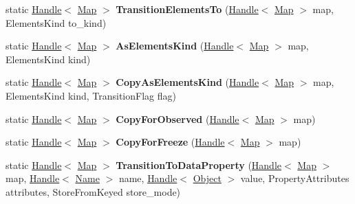 \begin{DoxyCompactItemize}
\item 
\hypertarget{classv8_1_1internal_1_1_map_a401e96aac7c58536324d566b3502a3cf}{}static \hyperlink{classv8_1_1internal_1_1_handle}{Handle}$<$ \hyperlink{classv8_1_1internal_1_1_map}{Map} $>$ {\bfseries Transition\+Elements\+To} (\hyperlink{classv8_1_1internal_1_1_handle}{Handle}$<$ \hyperlink{classv8_1_1internal_1_1_map}{Map} $>$ map, Elements\+Kind to\+\_\+kind)\label{classv8_1_1internal_1_1_map_a401e96aac7c58536324d566b3502a3cf}

\item 
\hypertarget{classv8_1_1internal_1_1_map_a15e6d5907827dda6c7abb49bb075ef5c}{}static \hyperlink{classv8_1_1internal_1_1_handle}{Handle}$<$ \hyperlink{classv8_1_1internal_1_1_map}{Map} $>$ {\bfseries As\+Elements\+Kind} (\hyperlink{classv8_1_1internal_1_1_handle}{Handle}$<$ \hyperlink{classv8_1_1internal_1_1_map}{Map} $>$ map, Elements\+Kind kind)\label{classv8_1_1internal_1_1_map_a15e6d5907827dda6c7abb49bb075ef5c}

\item 
\hypertarget{classv8_1_1internal_1_1_map_a1eeb7d87a60e6cf46bd069bf05b9f563}{}static \hyperlink{classv8_1_1internal_1_1_handle}{Handle}$<$ \hyperlink{classv8_1_1internal_1_1_map}{Map} $>$ {\bfseries Copy\+As\+Elements\+Kind} (\hyperlink{classv8_1_1internal_1_1_handle}{Handle}$<$ \hyperlink{classv8_1_1internal_1_1_map}{Map} $>$ map, Elements\+Kind kind, Transition\+Flag flag)\label{classv8_1_1internal_1_1_map_a1eeb7d87a60e6cf46bd069bf05b9f563}

\item 
\hypertarget{classv8_1_1internal_1_1_map_ae026f17d59c85dc65821f51f05b6c857}{}static \hyperlink{classv8_1_1internal_1_1_handle}{Handle}$<$ \hyperlink{classv8_1_1internal_1_1_map}{Map} $>$ {\bfseries Copy\+For\+Observed} (\hyperlink{classv8_1_1internal_1_1_handle}{Handle}$<$ \hyperlink{classv8_1_1internal_1_1_map}{Map} $>$ map)\label{classv8_1_1internal_1_1_map_ae026f17d59c85dc65821f51f05b6c857}

\item 
\hypertarget{classv8_1_1internal_1_1_map_af2d09ae1d540d751e180751f13494ffe}{}static \hyperlink{classv8_1_1internal_1_1_handle}{Handle}$<$ \hyperlink{classv8_1_1internal_1_1_map}{Map} $>$ {\bfseries Copy\+For\+Freeze} (\hyperlink{classv8_1_1internal_1_1_handle}{Handle}$<$ \hyperlink{classv8_1_1internal_1_1_map}{Map} $>$ map)\label{classv8_1_1internal_1_1_map_af2d09ae1d540d751e180751f13494ffe}

\item 
\hypertarget{classv8_1_1internal_1_1_map_acaead5ba3206e32b89d73b1d4f4aee17}{}static \hyperlink{classv8_1_1internal_1_1_handle}{Handle}$<$ \hyperlink{classv8_1_1internal_1_1_map}{Map} $>$ {\bfseries Transition\+To\+Data\+Property} (\hyperlink{classv8_1_1internal_1_1_handle}{Handle}$<$ \hyperlink{classv8_1_1internal_1_1_map}{Map} $>$ map, \hyperlink{classv8_1_1internal_1_1_handle}{Handle}$<$ \hyperlink{classv8_1_1internal_1_1_name}{Name} $>$ name, \hyperlink{classv8_1_1internal_1_1_handle}{Handle}$<$ \hyperlink{classv8_1_1internal_1_1_object}{Object} $>$ value, Property\+Attributes attributes, Store\+From\+Keyed store\+\_\+mode)\label{classv8_1_1internal_1_1_map_acaead5ba3206e32b89d73b1d4f4aee17}


\end{DoxyCompactItemize}

